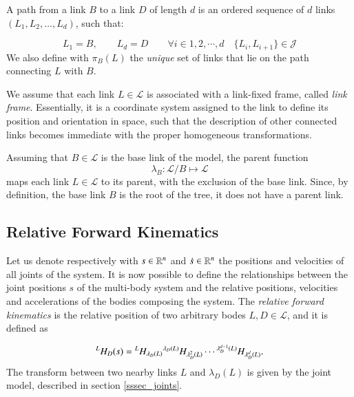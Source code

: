 \begin{defn}[Path]
    A path from a link $B$ to a link $D$ of length $d$ is an ordered sequence of $d$ links $(L_1, L_2, \ldots, L_d)$, such that:

    \begin{equation}\label{def_path}
        L_1 = B,\qquad L_d = D\qquad \forall i\in1,2,\cdots,d \quad \big\{ L_i, L_{i+1} \big\} \in \mathcal{J}
    \end{equation}
    We also define with $\pi_B(L)$ the \textit{unique} set of links that lie on the path connecting $L$ with $B$.
\end{defn}

\begin{defn}
    We assume that each link $L \in \mathcal{L}$ is associated with a link-fixed frame, called \textit{link frame}. Essentially, it is a coordinate system assigned to the link to define its position and orientation in space, such that the description of other connected links becomes immediate with the proper homogeneous transformations.
\end{defn}

\begin{defn}
Assuming that $B \in \mathcal{L}$ is the base link of the model, the parent function
\begin{equation}\label{def_parent_link}
    \lambda_B: \mathcal{L}/B \mapsto \mathcal{L}
\end{equation}
maps each link $L\in \mathcal{L}$ to its parent, with the exclusion of the base link. Since, by definition, the base link $B$ is the root of the tree, it does not have a parent link.
\end{defn}


\subsection{Relative Forward Kinematics}
Let us denote respectively with $s\in \mathbb{R}^{n}$ and $\dot{s}\in \mathbb{R}^{n}$ the positions and velocities of all joints of the system. It is now possible to define the relationships between the joint positions $s$ of the multi-body system and the relative positions, velocities and accelerations of the bodies composing the system. 
The \textit{relative forward kinematics} is the relative position of two arbitrary bodes $L,D \in \mathcal{L}$, and it is defined as

\begin{equation}\label{forward_kinematics}
    {}^{L}{H}_{D}(s) = {}^{L}{H}_{\lambda_D(L)}{}^{\lambda_D(L)}{H}_{\lambda^2_D(L)}\cdots{}^{\lambda^{d-1}_D(L)}{H}_{\lambda^d_D(L)}.
\end{equation}
The transform between two nearby links $L$ and $\lambda_D(L)$ is given by the joint model, described in section \ref{sssec_joints}.


